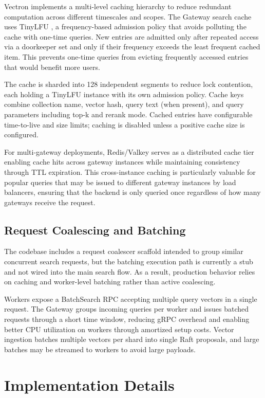 \documentclass[conference]{IEEEtran}
\begin{document}
Vectron implements a multi-level caching hierarchy to reduce redundant computation across different timescales and scopes. The Gateway search cache uses TinyLFU \cite{tinyLFU}, a frequency-based admission policy that avoids polluting the cache with one-time queries. New entries are admitted only after repeated access via a doorkeeper set and only if their frequency exceeds the least frequent cached item. This prevents one-time queries from evicting frequently accessed entries that would benefit more users.

The cache is sharded into 128 independent segments to reduce lock contention, each holding a TinyLFU instance with its own admission policy. Cache keys combine collection name, vector hash, query text (when present), and query parameters including top-k and rerank mode. Cached entries have configurable time-to-live and size limits; caching is disabled unless a positive cache size is configured.

For multi-gateway deployments, Redis/Valkey \cite{redis} serves as a distributed cache tier enabling cache hits across gateway instances while maintaining consistency through TTL expiration. This cross-instance caching is particularly valuable for popular queries that may be issued to different gateway instances by load balancers, ensuring that the backend is only queried once regardless of how many gateways receive the request.

\subsection{Request Coalescing and Batching}

The codebase includes a request coalescer scaffold intended to group similar concurrent search requests, but the batching execution path is currently a stub and not wired into the main search flow. As a result, production behavior relies on caching and worker-level batching rather than active coalescing.

Workers expose a BatchSearch RPC accepting multiple query vectors in a single request. The Gateway groups incoming queries per worker and issues batched requests through a short time window, reducing gRPC overhead and enabling better CPU utilization on workers through amortized setup costs. Vector ingestion batches multiple vectors per shard into single Raft proposals, and large batches may be streamed to workers to avoid large payloads.

\section{Implementation Details}
\end{document}
